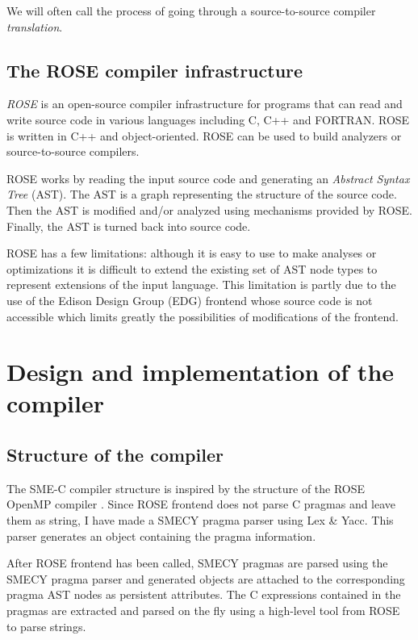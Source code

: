 \documentclass[a4paper]{article}
\begin{document}
	We will often call the process of going through a source-to-source compiler \emph{translation}.
	

	\subsection{The ROSE compiler infrastructure}
	\emph{ROSE} is an open-source compiler infrastructure for programs that can read and write source code in various languages including C, C++ and FORTRAN. ROSE is written in C++ and object-oriented. ROSE can be used to build analyzers or source-to-source compilers.
	
	ROSE works by reading the input source code and generating an \emph{Abstract Syntax Tree} (AST). The AST is a graph representing the structure of the source code. Then the AST is modified and/or analyzed using mechanisms provided by ROSE. Finally, the AST is turned back into source code.
	
	ROSE has a few limitations: although it is easy to use to make analyses or optimizations it is difficult to extend the existing set of AST node types to represent extensions of the input language. This limitation is partly due to the use of the Edison Design Group (EDG) frontend whose source code is not accessible which limits greatly the possibilities of modifications of the frontend.
	
\section{Design and implementation of the compiler}

	\subsection{Structure of the compiler}
	The SME-C compiler structure is inspired by the structure of the ROSE OpenMP compiler \cite{roseomp}. Since ROSE frontend does not parse C pragmas and leave them as string, I have made a SMECY pragma parser using Lex \& Yacc. This parser generates an object containing the pragma information.
	
	After ROSE frontend has been called, SMECY pragmas are parsed using the SMECY pragma parser and generated objects are attached to the corresponding pragma AST nodes as persistent attributes. The C expressions contained in the pragmas are extracted and parsed on the fly using a high-level tool from ROSE to parse strings.
	
\end{document}
